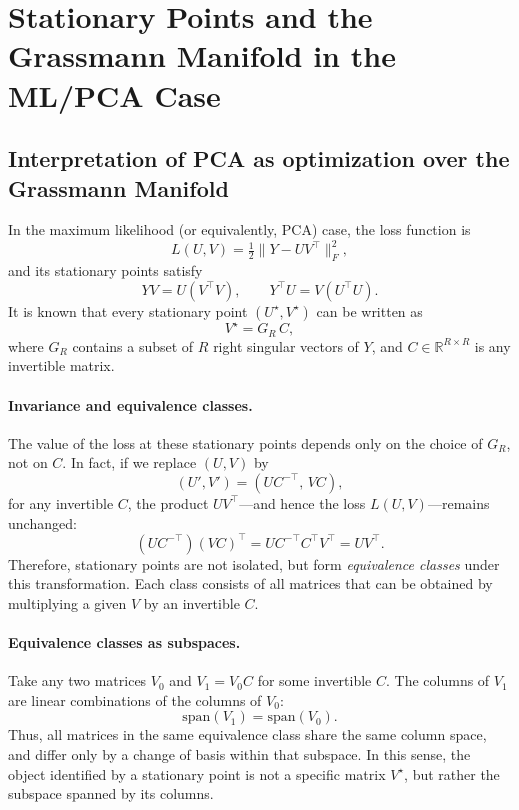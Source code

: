 \documentclass[11pt]{article}
\theoremstyle{spaced}
\begin{document}

\appendix

\section{Stationary Points and the Grassmann Manifold in the ML/PCA Case}

\subsection{Interpretation of PCA as optimization over the Grassmann Manifold}

In the maximum likelihood (or equivalently, PCA) case, the loss function is
\[
L(U,V) = \tfrac{1}{2}\|Y - UV^\top\|_F^2,
\]
and its stationary points satisfy
\[
YV = U(V^\top V), \qquad Y^\top U = V(U^\top U).
\]
It is known that every stationary point \( (U^\star, V^\star) \) can be written as
\[
V^\star = G_R\, C,
\]
where \(G_R\) contains a subset of \(R\) right singular vectors of \(Y\), and
\(C \in \mathbb{R}^{R\times R}\) is any invertible matrix. 

\paragraph{Invariance and equivalence classes.}
The value of the loss at these stationary points depends only on the choice of
\(G_R\), not on \(C\). In fact, if we replace \((U,V)\) by
\[
(U',V') = (U C^{-\top},\, V C),
\]
for any invertible \(C\), the product \(UV^\top\)---and hence the loss
\(L(U,V)\)---remains unchanged:
\[
(U C^{-\top})(V C)^\top = U C^{-\top} C^\top V^\top = UV^\top.
\]
Therefore, stationary points are not isolated, but form \emph{equivalence classes}
under this transformation. Each class consists of all matrices that can be obtained
by multiplying a given \(V\) by an invertible \(C\).

\paragraph{Equivalence classes as subspaces.}
Take any two matrices \(V_0\) and \(V_1 = V_0 C\) for some invertible \(C\).
The columns of \(V_1\) are linear combinations of the columns of \(V_0\):
\[
\mathrm{span}(V_1) = \mathrm{span}(V_0).
\]
Thus, all matrices in the same equivalence class share the same column space,
and differ only by a change of basis within that subspace. In this sense,
the object identified by a stationary point is not a specific matrix \(V^\star\),
but rather the subspace spanned by its columns.
\end{document}
